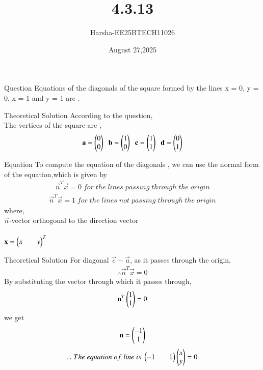 \documentclass{beamer}
\title %
{4.3.13}
\date{August 27,2025}
\author %
{Harsha-EE25BTECH11026}
\begin{document}
\frame{\titlepage}
\begin{frame}{Question}
Equations of the diagonals of the square formed by the lines x = 0, y = 0, x = 1 and y = 1 are \underline{\hspace{2cm}}.
\end{frame}

\begin{frame}{Theoretical Solution}
According to the question,\\
The vertices of the square are ,
\begin{align*}
    \mathbf{a}=\begin{pmatrix}0\\0\end{pmatrix}\;\;\mathbf{b}=\begin{pmatrix}1\\0\end{pmatrix}\;\;\mathbf{c}=\begin{pmatrix}1\\1\end{pmatrix}\;\;\mathbf{d}=\begin{pmatrix}0\\1\end{pmatrix}
\end{align*}
\end{frame}

\begin{frame}{Equation}
To compute the equation of the diagonals , we can use the normal form of the equation,which is given by
\begin{align*}
    \vec{n}^T\vec{x}=0 \;for \;the \;lines \;passing\;through \;the \;origin
\end{align*}
\begin{align*}
    \vec{n}^T\vec{x}=1 \;for \;the \;lines \;not \;passing\;through \;the \;origin
\end{align*}
where,\\
\hspace*{4em}  $\vec{n}$-vector orthogonal to the direction vector\\
\\
\hspace*{4em}  $\mathbf{x}=\begin{pmatrix}x&&y\end{pmatrix}^T$
\end{frame}

\begin{frame}{Theoretical Solution}
For diagonal $\vec{c}-\vec{a}$, as it passes through the origin,
\begin{align*}
    \therefore \vec{n}^T\vec{x}=0
\end{align*}
By substituting the vector through which it passes through,
\begin{align*}
    \mathbf{n}^T\begin{pmatrix}1\\1\end{pmatrix}=0
\end{align*}
we get
\begin{align*}
    \mathbf{n}=\begin{pmatrix}-1\\1\end{pmatrix}
\end{align*}
\begin{align*}
    \therefore The\;equation\;of\;line\;is\;\begin{pmatrix}-1&&1\end{pmatrix}\begin{pmatrix}x\\y\end{pmatrix}=0
\end{align*}
\end{frame}
\end{document}
